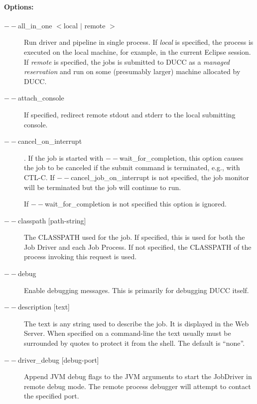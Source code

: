         \paragraph{Options:}
           \begin{description}

           \item[$--$all\_in\_one $<$local $|$ remote $>$]
               Run driver and pipeline in single process.  If {\em local} is specified, the
               process is executed on the local machine, for example, in the current Eclipse session.
               If {\em remote} is specified, the jobs is submitted to DUCC as a {\em managed reservation}
               and run on some (presumably larger) machine allocated by DUCC.

           \item[$--$attach\_console] If specified, redirect remote stdout and stderr
             to the local submitting console.

           \item[$--$cancel\_on\_interrupt].  If the job is started with $--$wait\_for\_completion, this
             option causes the job to be canceled if the submit command is terminated,
             e.g., with CTL-C. If $--$cancel\_job\_on\_interrupt is not
             specified, the job monitor will be terminated but the job will continue to run.

             If $--$wait\_for\_completion is not specified this option is ignored. 

           \item[$--$classpath {[path-string]}] The CLASSPATH used for the job.  If specified, this is used
             for both the Job Driver and each Job Process. If not specified, the CLASSPATH of the
             process invoking this request is used.

           \item[$--$debug] Enable debugging messages. This is primarily for debugging DUCC itself.

           \item[$--$description {[text]}] The text is any string used to describe the job. It is
             displayed in the Web Server. When specified on a command-line the text usually 
             must be surrounded by quotes to protect it from the shell.  The default is ``none''.

           \item[$--$driver\_debug {[debug-port]}] Append JVM debug flags to the JVM arguments
             to start the JobDriver in remote debug mode.  The remote process debugger will attempt
             to contact the specified port.


\end{description}
